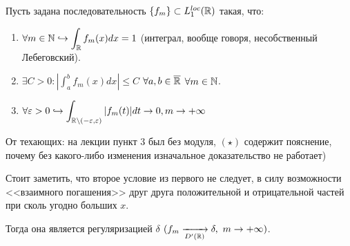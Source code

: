 \begin{theorem}
    Пусть задана последовательность $\{f_m\} \subset L_1^{loc}(\mathbb{R})$ такая, что:
    \begin{enumerate}
        \item $\displaystyle \forall m \in \mathbb{N} \hookrightarrow \int_{\mathbb{R}} f_m(x) dx = 1$ (интеграл, вообще говоря, несобственный Лебеговский).

        \item $\displaystyle \exists C > 0 : \left|\int_a^b f_m(x)dx\right| \leq C$ $\forall a, b \in \overline{\mathbb{R}}$ $\forall m \in \mathbb{N}$.

        \item $\displaystyle \forall \varepsilon > 0 \hookrightarrow \int_{\mathbb{R} \setminus (-\varepsilon, \varepsilon)} |f_m(t)|dt \rightarrow 0, m \rightarrow +\infty$
    \end{enumerate}
    \begin{remark}
        От техающих: на лекции пункт $3$ был без модуля, $(\star)$ содержит пояснение, почему без какого-либо изменения изначальное доказательство не работает)
    \end{remark}
    \begin{note}
        Стоит заметить, что второе условие из первого не следует, в силу возможности <<взаимного погашения>> друг друга положительной и отрицательной частей при сколь угодно больших $x$.
    \end{note}
    Тогда она является регуляризацией $\delta$ $(f_m \xrightarrow[D'(\mathbb{R})]{} \delta, \ m \rightarrow +\infty)$.
\end{theorem}
